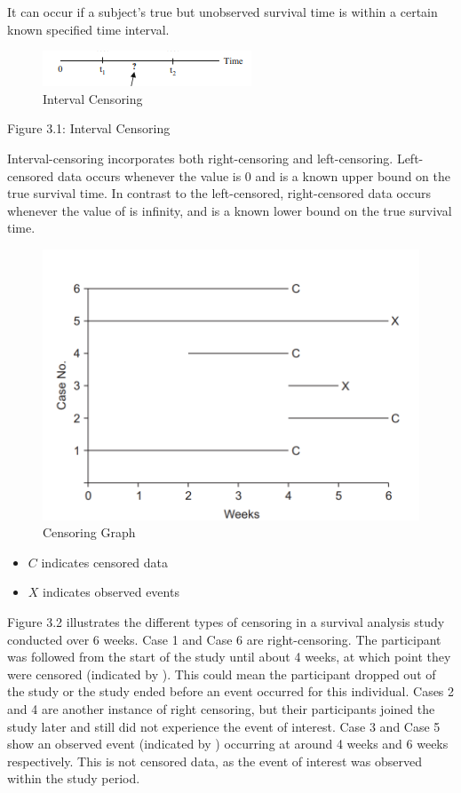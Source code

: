 \documentclass[12pt]{report}
\begin{document}
It can occur if a subject’s true but unobserved survival time is within a certain known specified time interval. 
\begin{figure}
    \centering
    \includegraphics[width=0.5\linewidth]{Figure 3/3.1.png}
    \caption{Interval Censoring}
    \label{Figure 3.1}
\end{figure}
Figure 3.1: Interval Censoring

Interval-censoring incorporates both right-censoring and left-censoring. Left-censored data occurs whenever the value is 0 and  is a known upper bound on the true survival time. In contrast to the left-censored, right-censored data occurs whenever the value of  is infinity, and is a known lower bound on the true survival time.
\begin{figure}
    \centering
    \includegraphics[width=0.5\linewidth]{Figure 3/3.2.png}
    \caption{Censoring Graph}
    \label{Figure 3.1}
\end{figure}


\begin{itemize}

\item \(C\) indicates censored data
\item  \(X\) indicates observed events


\end{itemize}

Figure 3.2 illustrates the different types of censoring in a survival analysis study conducted over 6 weeks. Case 1 and Case 6 are right-censoring. The participant was followed from the start of the study until about 4 weeks, at which point they were censored (indicated by ). This could mean the participant dropped out of the study or the study ended before an event occurred for this individual. Cases 2 and 4 are another instance of right censoring, but their participants joined the study later and still did not experience the event of interest. Case 3 and Case 5 show an observed event (indicated by ) occurring at around 4 weeks and 6 weeks respectively. This is not censored data, as the event of interest was observed within the study period.
\end{document}
